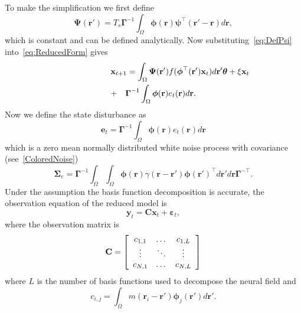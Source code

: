 \documentclass[twocolumn,11pt,a4paper]{article}		%
\begin{document}
To make the simplification we first define
\begin{equation}\label{eq:DefPsi}
	\boldsymbol{\Psi}(\mathbf{r}') = T_s\boldsymbol{\Gamma}^{-1}\int_\Omega {\boldsymbol{\phi}(\mathbf{r})\boldsymbol{\psi}^{\top} (\mathbf{r}'-\mathbf{r})d\mathbf{r}},
\end{equation}
which is constant and can be defined analytically. Now substituting~\ref{eq:DefPsi} into~\ref{eq:ReducedForm} gives
\begin{eqnarray}
	\lefteqn{\mathbf{x}_{t+1} \nonumber= \int_\Omega \boldsymbol{\Psi}(\mathbf{r}') f(\boldsymbol{\phi}^{\top}(\mathbf{r}')\mathbf{x}_t) d\mathbf{r}' \boldsymbol{\theta} + \xi\mathbf{x}_t}\nonumber \\
& +& \boldsymbol{\Gamma}^{-1} \int_\Omega{\boldsymbol{\phi}(\mathbf{r})e_t(\mathbf{r})d\mathbf{r}}.
\end{eqnarray}
Now we define the state disturbance as
\begin{equation}\label{eq:AppendixWt} 
	\mathbf{e}_t=\boldsymbol{\Gamma}^{-1}\int_\Omega {\boldsymbol{\phi} ( \mathbf{r} )e_t( \mathbf{r} )d\mathbf{r}} 
\end{equation}
which is a zero mean normally distributed white noise process with covariance (see~\ref{ColoredNoise})
\begin{equation}
	\boldsymbol\Sigma_e =\mathbf{\Gamma}^{-1}\int_{\Omega}\int_{\Omega}\boldsymbol{\phi}\left(\mathbf r\right) \gamma\left(\mathbf r- \mathbf r' \right)\boldsymbol{\phi}\left(\mathbf r'\right)^{\top}d\mathbf r' d\mathbf r\mathbf{\Gamma}^{- \top}. 
\end{equation}
Under the assumption the basis function decomposition is accurate, the observation equation of the reduced model is
\begin{equation}\label{ObservationEquation} 
	\mathbf{y}_t = \mathbf{C}\mathbf{x}_t + \boldsymbol{\varepsilon}_t,
\end{equation}
where the observation matrix is 
\begin{equation}
	\mathbf{C} = \left[
	\begin{array}{{ccc}} 
		c_{1,1} & \dots & c_{1,L} \\
		\vdots & \ddots & \vdots \\
		c_{N,1} & \dots & c_{N,L} 
	\end{array}
	\right] 
\end{equation}
where $L$ is the number of basis functions used to decompose the neural field and 
\begin{equation}
	c_{i,j} = \int_{\Omega}m(\mathbf{r}_i - \mathbf{r}')\boldsymbol{\phi}_j(\mathbf{r}')d\mathbf{r}'. 
\end{equation}
\end{document}
